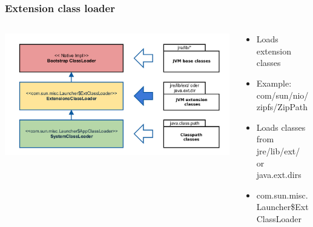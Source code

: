 \documentclass[aspectratio=169]{beamer}
\begin{document}
\begin{frame}
	\frametitle{Extension class loader}
	\begin{columns}[T] 
		\begin{column}{.46\textwidth}
			\includegraphics[scale=0.06]{assets/classloader-hierachie-extension-active.png}
		\end{column}
		\hfill
		\begin{column}{.56\textwidth}

		\begin{itemize}
			\item{Loads extension classes}
			\item{Example: com/sun/nio/zipfs/ZipPath}
			\item{Loads classes from jre/lib/ext/ or java.ext.dirs}
			\item{com.sun.misc.Launcher\$ExtClassLoader}
		\end{itemize}
		\end{column}
	\end{columns}
\end{frame}
\end{document}

